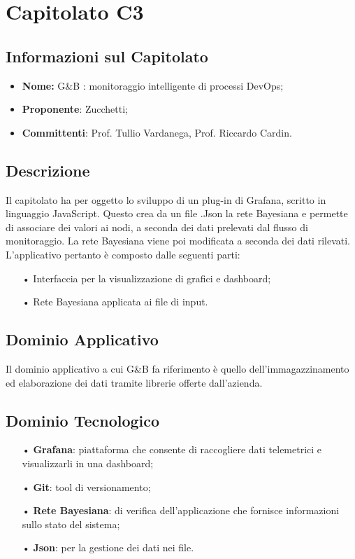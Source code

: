 \section{Capitolato C3}

\subsection{Informazioni sul Capitolato}

\begin{itemize}
	\item \textbf{Nome:} G\&{B} : monitoraggio intelligente di processi DevOps;
	\item \textbf{Proponente}: Zucchetti;
	\item \textbf{Committenti}: Prof. Tullio Vardanega, Prof. Riccardo Cardin.
\end{itemize}

\subsection{Descrizione}
Il capitolato ha per oggetto lo sviluppo di un plug-in di Grafana, scritto in linguaggio JavaScript. Questo crea da un file .Json la rete Bayesiana e permette di associare dei valori ai nodi, a seconda dei dati prelevati dal {flusso} di monitoraggio.
La rete Bayesiana viene poi modificata a seconda dei dati rilevati. 
L'applicativo pertanto è composto dalle seguenti parti: 

\begin{itemize}

\item[•] Interfaccia per la visualizzazione di grafici e dashboard;
\item[•] Rete Bayesiana applicata ai file di input.

\end{itemize}

\subsection{Dominio Applicativo}
Il dominio applicativo a cui G\&{B} fa riferimento è quello dell'immagazzinamento ed elaborazione dei dati tramite librerie offerte dall'azienda. 

\subsection{Dominio Tecnologico}
\begin{itemize}

\item[•] \textbf{Grafana}: piattaforma che consente di raccogliere dati telemetrici e visualizzarli in una dashboard;
\item[•] \textbf{Git}: tool di versionamento;
\item[•] \textbf{Rete Bayesiana}: di verifica dell'applicazione che fornisce informazioni sullo stato del sistema;
\item[•] \textbf{Json}: per la gestione dei dati nei file.

\end{itemize}

